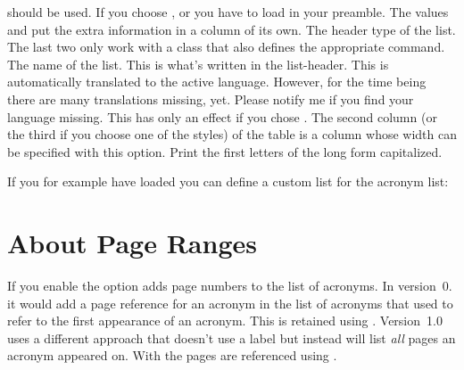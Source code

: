\documentclass[DIV10,toc=index,toc=bib,hyperfootnotes=false]{cnpkgdoc}
\makeatletter
\newcommand*\changedversion[1]{%
  \@bsphack
  \marginnote{%
    \footnotesize\sffamily\RaggedRight
    \textcolor{black!75}{Changed in version~#1}}%
  \@esphack}
\newcommand\versionstar{\texorpdfstring{\@versionstar}{*}}
\makeatother
\begin{document}
\begin{beschreibung}
   should be used. If you choose ,  or
    you have to load  in your preamble.
   The values  and  put the extra
   information in a column of its own.
   \changedversion{1.1}The header type of the list. The last two only work with
   a \KOMAScript{} class that also defines the appropriate command.
   The name of the list. This is what's written in the list-header. This is
   automatically translated to the active language. However, for the time being
   there are many translations missing, yet. Please notify me if you find your
   language missing.
   This has only an effect if you chose . The second column
   (or the third if you choose one of the  styles) of the table is a
    column whose width can be specified with this option.
   Print the first letters of the long form capitalized.
\end{beschreibung}

If you for example have loaded  you can define a custom list for
the acronym list:
\begin{beispiel}
 \newcommand*\addcolon[1]{#1:}
 \printacronyms
\end{beispiel}
\newcommand*\addcolon[1]{#1:}
\printacronyms

\section{About Page Ranges}
If you enable the  option \acro adds page numbers to the list of
acronyms. In version~0.\versionstar{} it would add a page reference for an acronym
in the list of acronyms that used  to refer to the first appearance
of an acronym. This is retained using . Version~1.0 uses a
different approach that doesn't use a label but instead will list \emph{all}
pages an acronym appeared on. With  the pages are referenced
using .
\end{document}
